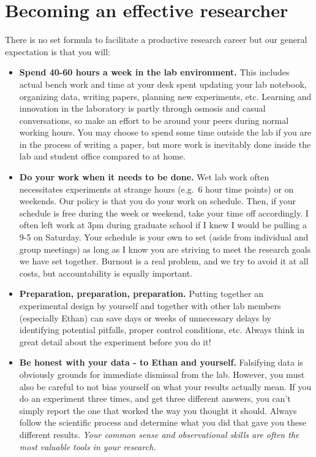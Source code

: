 \documentclass[
]{book}
\begin{document}
\hypertarget{becoming-an-effective-researcher}{%
\section{Becoming an effective researcher}\label{becoming-an-effective-researcher}}

There is no set formula to facilitate a productive research career but our general expectation is that you will:

\begin{itemize}
\item
  \textbf{Spend 40-60 hours a week in the lab environment.} This includes actual bench work and time at your desk spent updating your lab notebook, organizing data, writing papers, planning new experiments, etc. Learning and innovation in the laboratory is partly through osmosis and casual conversations, so make an effort to be around your peers during normal working hours. You may choose to spend some time outside the lab if you are in the process of writing a paper, but more work is inevitably done inside the lab and student office compared to at home.
\item
  \textbf{Do your work when it needs to be done.} Wet lab work often necessitates experiments at strange hours (e.g.~6 hour time points) or on weekends. Our policy is that you do your work on schedule. Then, if your schedule is free during the week or weekend, take your time off accordingly. I often left work at 3pm during graduate school if I knew I would be pulling a 9-5 on Saturday. Your schedule is your own to set (aside from individual and group meetings) as long as I know you are striving to meet the research goals we have set together. Burnout is a real problem, and we try to avoid it at all costs, but accountability is equally important.
\item
  \textbf{Preparation, preparation, preparation.} Putting together an experimental design by yourself and together with other lab members (especially Ethan) can save days or weeks of unnecessary delays by identifying potential pitfalls, proper control conditions, etc. Always think in great detail about the experiment before you do it!
\item
  \textbf{Be honest with your data - to Ethan and yourself.} Falsifying data is obviously grounds for immediate dismissal from the lab. However, you must also be careful to not bias yourself on what your results actually mean. If you do an experiment three times, and get three different answers, you can't simply report the one that worked the way you thought it should. Always follow the scientific process and determine what you did that gave you these different results. \emph{Your common sense and observational skills are often the most valuable tools in your research.}

\end{itemize}
\end{document}
